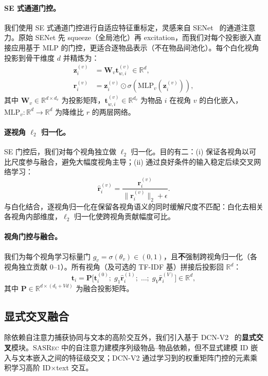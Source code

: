 \documentclass[sigconf,natbib=true,anonymous]{acmart}
\newcommand{\base}{\textsc{SASRec}\xspace}
\newcommand{\tfidf}{\textsc{TF-IDF}\xspace}
\begin{document}
\paragraph{SE 式通道门控。}
我们使用 SE 式通道门控进行自适应特征重标定，灵感来自 SENet~\cite{hu2018senet} 的通道注意力。原始 SENet 先 squeeze（全局池化）再 excitation，而我们对每个投影嵌入直接应用基于 MLP 的门控，更适合逐物品表示（不在物品间池化）。每个白化视角投影到骨干维度 $d$ 并精炼为：
\begin{align}
  \mathbf{z}_i^{(v)} &= \mathbf{W}_v \mathbf{t}_{w,i}^{(v)} \in \mathbb{R}^d,\\
  \mathbf{r}_i^{(v)} &= \mathbf{z}_i^{(v)} \odot \sigma(\mathrm{MLP}_v(\mathbf{z}_i^{(v)})),
\end{align}
其中 $\mathbf{W}_v \in \mathbb{R}^{d \times d_v}$ 为投影矩阵，$\mathbf{t}_{w,i}^{(v)} \in \mathbb{R}^{d_v}$ 为物品 $i$ 在视角 $v$ 的白化嵌入，$\mathrm{MLP}_v: \mathbb{R}^d \to \mathbb{R}^d$ 为降维比 $r$ 的两层网络。

\paragraph{逐视角 $\ell_2$ 归一化。}
SE 门控后，我们对每个视角独立做 $\ell_2$ 归一化。目的有二：(i) 保证各视角以可比尺度参与融合，避免大幅度视角主导；(ii) 通过良好条件的输入稳定后续交叉网络学习：
\begin{equation}
  \hat{\mathbf{r}}_i^{(v)} = \frac{\mathbf{r}_i^{(v)}}{\lVert \mathbf{r}_i^{(v)} \rVert_2 + \epsilon}.
\end{equation}
与白化结合，逐视角归一化在保留各视角语义的同时缓解尺度不匹配：白化去相关各视角内部维度，$\ell_2$ 归一化使跨视角贡献幅度可比。

\paragraph{视角门控与融合。}
我们为每个视角学习标量门 $g_v=\sigma(\theta_v)\in(0,1)$，且\textbf{不}强制跨视角归一化（各视角独立贡献 $0$--$1$）。所有视角（及可选的 \tfidf 基）拼接后投影回 $\mathbb{R}^d$：
\begin{equation}
  \mathbf{t}_i = \mathbf{P}\Big[\mathbf{t}_i^{(0)};\; g_1\hat{\mathbf{r}}_i^{(1)};\; \dots;\; g_V\hat{\mathbf{r}}_i^{(V)}\Big] \in \mathbb{R}^d,
\end{equation}
其中 $\mathbf{P} \in \mathbb{R}^{d \times (d_t + Vd)}$ 为融合投影矩阵。

\subsection{显式交叉融合}\label{sec:cross}
除依赖自注意力捕获协同与文本的高阶交互外，我们引入基于 DCN-V2~\cite{wang2021dcnv2} 的\textbf{显式交叉}模块。\base 中的自注意力建模序列级物品--物品依赖，但不显式建模 ID 嵌入与文本嵌入之间的特征级交叉；DCN-V2 通过学习到的权重矩阵门控的元素乘积学习高阶 ID$\times$text 交互。
\end{document}
